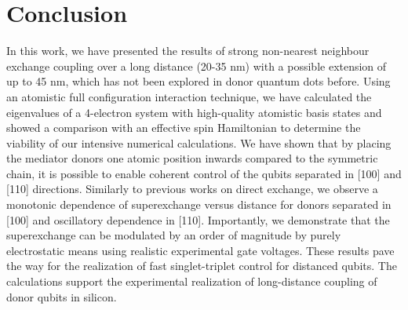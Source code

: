 \documentclass[%
showkeys,
 amsmath,amssymb,
 aps,
prb,
]{revtex4-2}
\begin{document}
\section{Conclusion}
In this work, we have presented the results of strong non-nearest neighbour exchange coupling over a long distance (20-35 nm) with a possible extension of up to 45 nm, which has not been explored in donor quantum dots before. Using an atomistic full configuration interaction technique, we have calculated the eigenvalues of a 4-electron system with high-quality atomistic basis states and showed a comparison with an effective spin Hamiltonian to determine the viability of our intensive numerical calculations. We have shown that by placing the mediator donors one atomic position inwards compared to the symmetric chain, it is possible to enable coherent control of the qubits separated in [100] and [110] directions. Similarly to previous works on direct exchange, we observe a monotonic dependence of superexchange versus distance for donors separated in [100] and oscillatory dependence in [110]. Importantly, we demonstrate that the superexchange can be modulated by an order of magnitude by purely electrostatic means using realistic experimental gate voltages. These results pave the way for the realization of fast singlet-triplet control for distanced qubits. The calculations support the experimental realization of long-distance coupling of donor qubits in silicon. 


\newpage
\appendix

\end{document}
